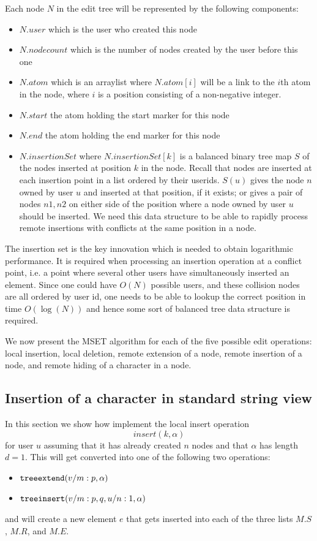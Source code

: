 \documentclass{amsart}
\begin{document}
Each node $N$ in the edit tree will be represented by the following components:
\begin{itemize}
\item $N.user$ which is the user who created this node
\item $N.nodecount$ which is the number of nodes created by the user before this one
\item $N.atom$ which is an arraylist where $N.atom[i]$ will be a link to the $i$th atom in the node, where $i$ is a position consisting of a non-negative integer.
\item $N.start$ the atom holding the start marker for this node
\item $N.end$ the atom holding the end marker for this node
\item $N.insertionSet$ where $N.insertionSet[k]$ is a balanced binary tree map $S$ of the nodes inserted at position $k$ in the node.
Recall that nodes are inserted at each insertion point in a list ordered by their
userids. $S(u)$ gives the node $n$ owned by user $u$ and inserted at that position, if it exists; or gives a pair of nodes $n1,n2$ on either side of the position where a node owned by user $u$ should be inserted. We need this data structure to be able to rapidly process remote insertions with conflicts at the same position in a node. 
\end{itemize}
The insertion set is the key innovation which is needed to obtain logarithmic performance. It is required when processing an insertion operation at a conflict point, i.e. a point where several other users have simultaneously inserted an element. Since one could have $O(N)$ possible users, and these collision nodes are all ordered by user id, one needs to be able to lookup the correct position in time $O(\log(N))$ and hence some sort of balanced tree data structure is required.

We now present the MSET algorithm for each of the five possible edit operations: local insertion, local deletion, remote extension of a node, remote insertion of a node, and remote hiding of a character in a node.


\subsection{Insertion of a character in standard string view}

In this section we show how implement the local insert operation 
\[
insert(k,\alpha)
\]
for user $u$ assuming that it has already created $n$ nodes and that $\alpha$ has length $d=1$. This will get converted into one of the following two operations:
\begin{itemize}
\item ${\tt treeextend}(v/m:p,\alpha)$ 
\item ${\tt treeinsert}(v/m:p,q,u/n:1,\alpha) $
\end{itemize}
and will create a new element $e$ that gets inserted into each of the three lists
$M.S$, $M.R$, and $M.E$.
\end{document}
